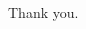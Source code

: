 \label{ally:12}
\begin{paracol}{2}
  \begin{leftcolumn}

\null
\vfill
\begin{ally}
Thank you.
\end{ally}
\vfill
\newpage

\end{leftcolumn}
\end{paracol}

